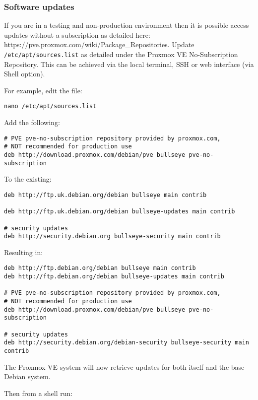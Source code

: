 \hypertarget{software-updates}{%
\subsubsection{Software updates}\label{software-updates}}

If you are in a testing and non-production environment then it is
possible access updates without a subscription as detailed here:
https://pve.proxmox.com/wiki/Package\_Repositories. Update
\texttt{/etc/apt/sources.list} as detailed under the Proxmox VE
No-Subscription Repository. This can be achieved via the local terminal,
SSH or web interface (via Shell option).

For example, edit the file:

\texttt{nano\ /etc/apt/sources.list}

Add the following:

\begin{verbatim}
# PVE pve-no-subscription repository provided by proxmox.com,
# NOT recommended for production use
deb http://download.proxmox.com/debian/pve bullseye pve-no-subscription
\end{verbatim}

To the existing:

\begin{verbatim}
deb http://ftp.uk.debian.org/debian bullseye main contrib

deb http://ftp.uk.debian.org/debian bullseye-updates main contrib

# security updates
deb http://security.debian.org bullseye-security main contrib
\end{verbatim}

Resulting in:

\begin{verbatim}
deb http://ftp.debian.org/debian bullseye main contrib
deb http://ftp.debian.org/debian bullseye-updates main contrib

# PVE pve-no-subscription repository provided by proxmox.com,
# NOT recommended for production use
deb http://download.proxmox.com/debian/pve bullseye pve-no-subscription

# security updates
deb http://security.debian.org/debian-security bullseye-security main contrib
\end{verbatim}

The Proxmox VE system will now retrieve updates for both itself and the
base Debian system.

Then from a shell run:

